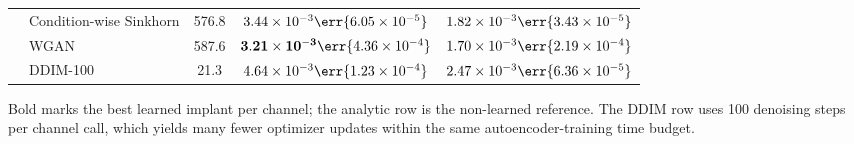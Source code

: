 \begin{table}[t]
\begin{tabular}{@{}llccc@{}}
& Condition-wise Sinkhorn & 576.8 & $3.44\times 10^{-3}\err{6.05\times 10^{-5}}$ & $1.82\times 10^{-3}\err{3.43\times 10^{-5}}$ \\
& WGAN & 587.6 & $\mathbf{3.21\times 10^{-3}}\err{4.36\times 10^{-4}}$ & $1.70\times 10^{-3}\err{2.19\times 10^{-4}}$ \\
& DDIM-100 & 21.3 & $4.64\times 10^{-3}\err{1.23\times 10^{-4}}$ & $2.47\times 10^{-3}\err{6.36\times 10^{-5}}$ \\
\bottomrule
\end{tabular}
\par\vspace{0.25em}
\begin{minipage}{0.96\textwidth}
\footnotesize\raggedright
Bold marks the best learned implant per channel; the analytic row is the non-learned reference. The DDIM row uses 100 denoising steps per channel call, which yields many fewer optimizer updates within the same autoencoder-training time budget.
\end{minipage}
\end{table}
